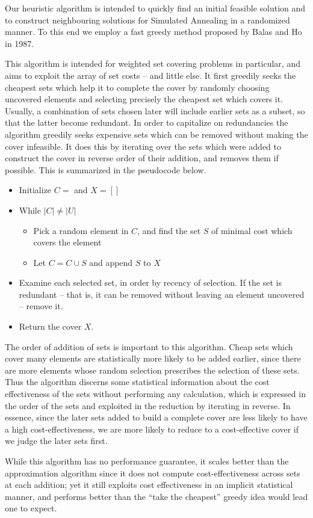Our heuristic algorithm is intended to quickly find an initial feasible solution and to construct neighbouring solutions for Simulated Annealing in a randomized manner. To this end we employ a fast greedy method proposed by Balas and Ho in 1987.

This algorithm is intended for weighted set covering problems in particular, and aims to exploit the array of set costs -- and little else. It first greedily seeks the cheapest sets which help it to complete the cover by randomly choosing uncovered elements and selecting precisely the cheapest set which covers it. Usually, a combination of sets chosen later will include earlier sets as a subset, so that the latter become redundant. In order to capitalize on redundancies the algorithm greedily seeks expensive sets which can be removed without making the cover infeasible. It does this by iterating over the sets which were added to construct the cover in reverse order of their addition, and removes them if possible. This is summarized in the pseudocode below.
\begin{itemize}
    \item Initialize $C={}$ and $X=[]$
    \item While $|C| \neq |U|$
    \begin{itemize}
        \item Pick a random element in $C$, and find the set $S$ of minimal cost which covers the element
        \item Let $C = C \cup S$ and append $S$ to $X$
    \end{itemize}
    \item Examine each selected set, in order by recency of selection. If the set is redundant -- that is, it can be removed without leaving an element uncovered -- remove it.
    \item Return the cover $X$.
\end{itemize}

The order of addition of sets is important to this algorithm. Cheap sets which cover many elements are statistically more likely to be added earlier, since there are more elements whose random selection prescribes the selection of these sets. Thus the algorithm discerns some statistical information about the cost effectiveness of the sets without performing any calculation, which is expressed in the order of the sets and exploited in the reduction by iterating in reverse. In essence, since the later sets added to build a complete cover are less likely to have a high cost-effectiveness, we are more likely to reduce to a cost-effective cover if we judge the later sets first.

While this algorithm has no performance guarantee, it scales better than the approximation algorithm since it does not compute cost-effectiveness across sets at each addition; yet it still exploits cost effectiveness in an implicit statistical manner, and performs better than the ``take the cheapest'' greedy idea would lead one to expect.

